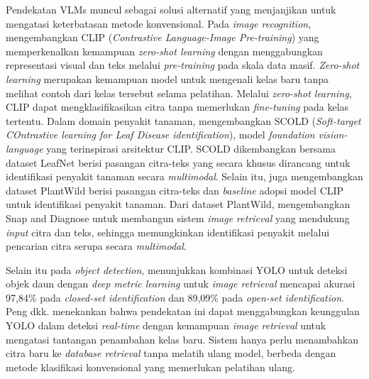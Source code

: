 Pendekatan VLMs muncul sebagai solusi alternatif yang menjanjikan untuk mengatasi keterbatasan metode konvensional. Pada \textit{image recognition}, \textcite{radfordLearningTransferableVisual2021} mengembangkan CLIP (\textit{Contrastive Language-Image Pre-training}) yang memperkenalkan kemampuan \textit{zero-shot learning} dengan menggabungkan representasi visual dan teks melalui \textit{pre-training} pada skala data masif. \textit{Zero-shot learning} merupakan kemampuan model untuk mengenali kelas baru tanpa melihat contoh dari kelas tersebut selama pelatihan. Melalui \textit{zero-shot learning}, CLIP dapat mengklasifikasikan citra tanpa memerlukan \textit{fine-tuning} pada kelas tertentu. Dalam domain penyakit tanaman, \textcite{quocVisionLanguageFoundationModel2025} mengembangkan SCOLD (\textit{Soft-target COntrastive learning for Leaf Disease identification}), model \textit{foundation vision-language} yang terinspirasi arsitektur CLIP. SCOLD dikembangkan bersama dataset LeafNet berisi pasangan citra-teks yang secara khusus dirancang untuk identifikasi penyakit tanaman secara \textit{multimodal}. Selain itu, \textcite{weiBenchmarkingInthewildMultimodal2024} juga mengembangkan dataset PlantWild berisi pasangan citra-teks dan \textit{baseline} adopsi model CLIP untuk identifikasi penyakit tanaman. Dari dataset PlantWild, \textcite{weiSnapDiagnoseAdvanced2024} mengembangkan Snap and Diagnose untuk membangun sistem \textit{image retrieval} yang mendukung \textit{input} citra dan teks, sehingga memungkinkan identifikasi penyakit melalui pencarian citra serupa secara \textit{multimodal}.

Selain itu pada \textit{object detection}, \textcite{pengLeafDiseaseImage2022} menunjukkan kombinasi YOLO untuk deteksi objek daun dengan \textit{deep metric learning} untuk \textit{image retrieval} mencapai akurasi 97,84\% pada \textit{closed-set identification} dan 89,09\% pada \textit{open-set identification}. Peng dkk. menekankan bahwa pendekatan ini dapat menggabungkan keunggulan YOLO dalam deteksi \textit{real-time} dengan kemampuan \textit{image retrieval} untuk mengatasi tantangan penambahan kelas baru. Sistem hanya perlu menambahkan citra baru ke \textit{database retrieval} tanpa melatih ulang model, berbeda dengan metode klasifikasi konvensional yang memerlukan pelatihan ulang.

